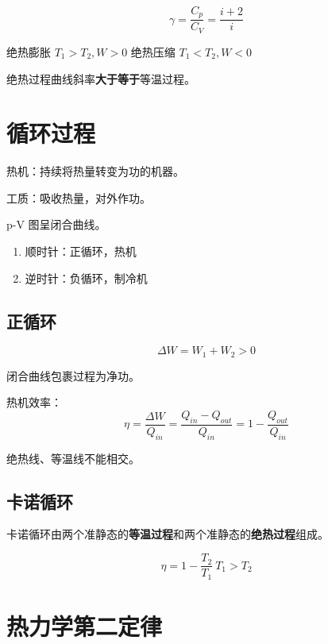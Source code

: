 \begin{enumerate}
          \begin{equation}
              \gamma{}=\frac{C_p}{C_V}=\frac{i+2}{i}
          \end{equation}

          绝热膨胀 $T_1>T_2,W>0$
          绝热压缩 $T_1<T_2,W<0$

          绝热过程曲线斜率\textbf{大于等于}等温过程。

\end{enumerate}

\section{循环过程}

热机：持续将热量转变为功的机器。

工质：吸收热量，对外作功。

p-V 图呈闭合曲线。

\begin{enumerate}
    \item 顺时针：正循环，热机
    \item 逆时针：负循环，制冷机
\end{enumerate}

\subsection{正循环}

\begin{equation}
    \Delta{W}=W_1+W_2>0
\end{equation}

闭合曲线包裹过程为净功。

热机效率：
\begin{equation}
    \eta=\frac{\Delta{W}}{Q_{in}}=\frac{Q_{in}-Q_{out}}{Q_{in}}=1-\frac{Q_{out}}{Q_{in}}
\end{equation}

绝热线、等温线不能相交。

\subsection{卡诺循环}

卡诺循环由两个准静态的\textbf{等温过程}和两个准静态的\textbf{绝热过程}组成。

\begin{equation}
    \eta=1-\frac{T_2}{T_1}~T_1>T_2
\end{equation}

\section{热力学第二定律}

